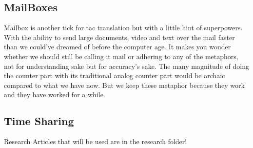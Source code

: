 \subsection{MailBoxes}
Mailbox is another tick for tac translation but with a little hint of superpowers.
With the ability to send large documents, video and text over the mail faster than we could've dreamed of before the computer age. It makes you wonder whether we should still be calling it mail or adhering to any of the metaphors, not for understanding sake but for accuracy's sake. The many magnitude of doing the counter part with its traditional analog counter part would be archaic compared to what we have now. But we keep these metaphor because they work and they have worked for a while.
\subsection{Time Sharing}
 Research Articles that will be used are in the research folder!
